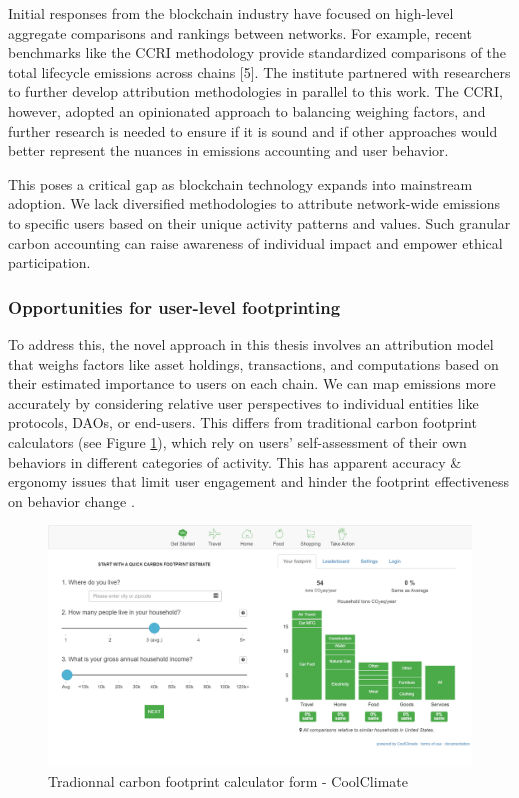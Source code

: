 \documentclass[11pt]{report}
\begin{document}
Initial responses from the blockchain industry have focused on high-level aggregate comparisons and rankings between networks. For example, recent benchmarks like the \ac{CCRI} methodology provide standardized comparisons of the total lifecycle emissions across chains [5]. The institute partnered with researchers to further develop attribution methodologies in parallel to this work. The CCRI, however, adopted an opinionated approach to balancing weighing factors, and further research is needed to ensure if it is sound and if other approaches would better represent the nuances in emissions accounting and user behavior.

This poses a critical gap as blockchain technology expands into mainstream adoption. We lack diversified methodologies to attribute network-wide emissions to specific users based on their unique activity patterns and values. Such granular carbon accounting can raise awareness of individual impact and empower ethical participation.

\subsubsection*{Opportunities for user-level footprinting}

To address this, the novel approach in this thesis involves an attribution model that weighs factors like asset holdings, transactions, and computations based on their estimated importance to users on each chain. We can map emissions more accurately by considering relative user perspectives to individual entities like protocols, DAOs, or end-users. This differs from traditional carbon footprint calculators (see Figure \ref{fig:carbon_footprint_calculator}), which rely on users' self-assessment of their own behaviors in different categories of activity. This has apparent accuracy \& ergonomy issues that limit user engagement and hinder the footprint effectiveness on behavior change \cite{saloOpportunitiesLimitationsCarbon2019,mulrowStateCarbonFootprint2019}.


\begin{figure}[hbt!]
    \centering
    \centerline{\includegraphics[scale=0.25]{figures/carbon_footprint_calculator.png}}
    \caption[YO]{Tradionnal carbon footprint calculator form - CoolClimate\footnotemark}
    \label{fig:carbon_footprint_calculator}
\end{figure}
\end{document}
